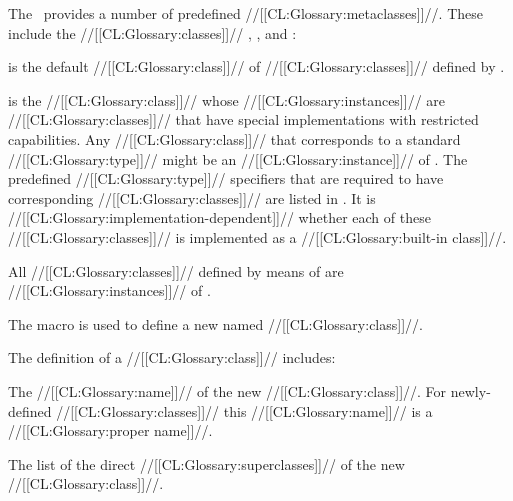 \endsubSection%















The \CLOS\ provides a number of predefined //[[CL:Glossary:metaclasses]]//. 
These include the //[[CL:Glossary:classes]]// , 
, and :

\beginlist

\itemitem{\bull}
 is the default //[[CL:Glossary:class]]// of 
//[[CL:Glossary:classes]]// defined by .
                        
\itemitem{\bull}  is the //[[CL:Glossary:class]]// whose
//[[CL:Glossary:instances]]// are //[[CL:Glossary:classes]]// that have special implementations with
restricted capabilities.  Any //[[CL:Glossary:class]]// that corresponds to a standard
//[[CL:Glossary:type]]// might be an //[[CL:Glossary:instance]]// of .
The predefined //[[CL:Glossary:type]]// specifiers that are required to have
corresponding //[[CL:Glossary:classes]]// are listed in \figref\ClassTypeCorrespondence.  
It is //[[CL:Glossary:implementation-dependent]]// whether each of these //[[CL:Glossary:classes]]// 
is implemented as a //[[CL:Glossary:built-in class]]//.

\itemitem{\bull}                     
All //[[CL:Glossary:classes]]// defined by means of  are
//[[CL:Glossary:instances]]// of .
\endlist

\endsubsubsection%

           
The macro  is used to define a new named //[[CL:Glossary:class]]//.  


The definition of a //[[CL:Glossary:class]]// includes:

\beginlist

\itemitem{\bull} The //[[CL:Glossary:name]]// of the new //[[CL:Glossary:class]]//. 
  For newly-defined //[[CL:Glossary:classes]]// this //[[CL:Glossary:name]]// is a //[[CL:Glossary:proper name]]//.

\itemitem{\bull} The list of the direct //[[CL:Glossary:superclasses]]// of the new //[[CL:Glossary:class]]//. 

